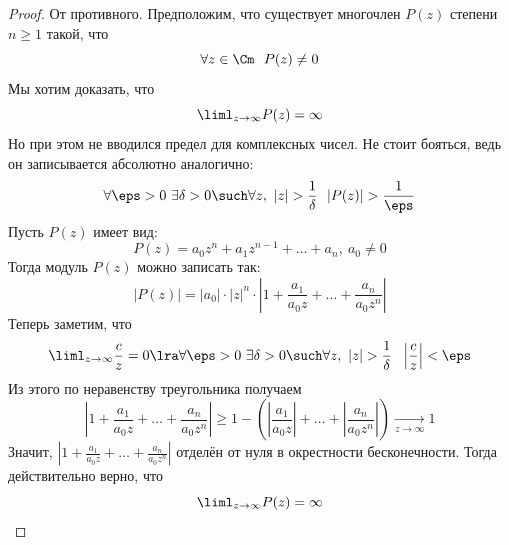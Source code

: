 \begin{proof}
	От противного. Предположим, что существует многочлен $P(z)$ степени $n \ge 1$ такой, что
	\[
		\forall z \in \Cm\ \ P(z) \neq 0
	\]
	Мы хотим доказать, что
	\[
		\liml_{z \to \infty} P(z) = \infty
	\]
	Но при этом не вводился предел для комплексных чисел. Не стоит бояться, ведь он записывается абсолютно аналогично:
	\[
		\forall \eps > 0\ \exists \delta > 0 \such \forall z,\ |z| > \frac{1}{\delta}\ \ |P(z)| > \frac{1}{\eps}
	\]
	Пусть $P(z)$ имеет вид:
	\[
		P(z) = a_0 z^n + a_1 z^{n - 1} + \ldots + a_n,\ a_0 \neq 0
	\]
	Тогда модуль $P(z)$ можно записать так:
	\[
		|P(z)| = |a_0| \cdot |z|^n \cdot \left|1 + \frac{a_1}{a_0 z} + \ldots + \frac{a_n}{a_0 z^n}\right|
	\]
	Теперь заметим, что
	\[
		\liml_{z \to \infty} \frac{c}{z} = 0 \lra \forall \eps > 0\ \exists \delta > 0 \such \forall z,\ |z| > \frac{1}{\delta}\ \ \left|\frac{c}{z}\right| < \eps
	\]
	Из этого по неравенству треугольника получаем
	\[
		\left|1 + \frac{a_1}{a_0 z} + \ldots + \frac{a_n}{a_0 z^n}\right| \ge 1 - \left(\left|\frac{a_1}{a_0 z}\right| + \ldots + \left|\frac{a_n}{a_0 z^n}\right|\right) \xrightarrow[z \to \infty]{} 1
	\]
	Значит, $\left|1 + \frac{a_1}{a_0 z} + \ldots + \frac{a_n}{a_0 z^n}\right|$ отделён от нуля в окрестности бесконечности. Тогда действительно верно, что
	\[
		\liml_{z \to \infty} P(z) = \infty
	\]
	

\end{proof}
